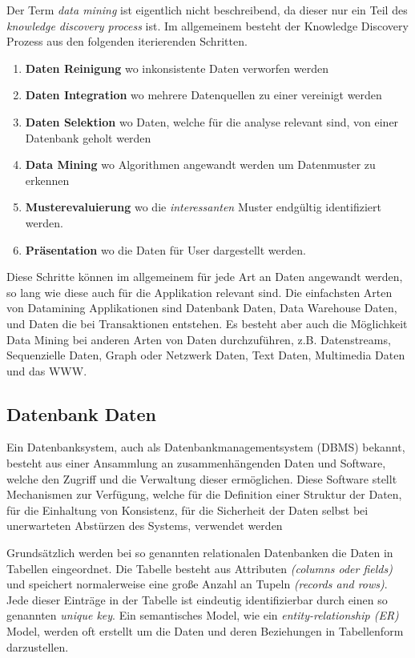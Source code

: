 Der Term \textit{data mining} ist eigentlich nicht beschreibend, da dieser nur ein Teil des \textit{knowledge discovery process} ist. Im allgemeinem besteht der Knowledge Discovery Prozess aus den folgenden iterierenden Schritten.

\begin{enumerate}
\item \textbf{Daten Reinigung} wo inkonsistente Daten verworfen werden
\item \textbf{Daten Integration} wo mehrere Datenquellen zu einer vereinigt werden
\item \textbf{Daten Selektion} wo Daten, welche für die analyse relevant sind, von einer Datenbank geholt werden
\item \textbf{Data Mining} wo Algorithmen angewandt werden um Datenmuster zu erkennen
\item \textbf{Musterevaluierung} wo die \textit{interessanten} Muster endgültig identifiziert werden.
\item \textbf{Präsentation} wo die Daten für User dargestellt werden.
\end{enumerate}

Diese Schritte können im allgemeinem für jede Art an Daten angewandt werden, so lang wie diese auch für die Applikation relevant sind. Die einfachsten Arten von Datamining Applikationen sind Datenbank Daten, Data Warehouse Daten, und Daten die bei Transaktionen entstehen. Es besteht aber auch die Möglichkeit Data Mining bei anderen Arten von Daten durchzuführen, z.B. Datenstreams, Sequenzielle Daten, Graph oder Netzwerk Daten, Text Daten, Multimedia Daten und das WWW. 

\subsection{Datenbank Daten}
Ein Datenbanksystem, auch als Datenbankmanagementsystem (DBMS) bekannt, besteht aus einer Ansammlung an zusammenhängenden Daten und Software, welche den Zugriff und die Verwaltung dieser ermöglichen. Diese Software stellt Mechanismen zur Verfügung, welche für die Definition einer Struktur der Daten, für die Einhaltung von Konsistenz, für die Sicherheit der Daten selbst bei unerwarteten Abstürzen des Systems, verwendet werden

Grundsätzlich werden bei so genannten relationalen Datenbanken die Daten in Tabellen eingeordnet. Die Tabelle besteht aus Attributen \textit{(columns oder fields)} und speichert normalerweise eine große Anzahl an Tupeln \textit{(records and rows)}. Jede dieser Einträge in der Tabelle ist eindeutig identifizierbar durch einen so genannten \textit{unique key}. Ein semantisches Model, wie ein \textit{entity-relationship (ER)} Model, werden oft erstellt um die Daten und deren Beziehungen in Tabellenform darzustellen.

